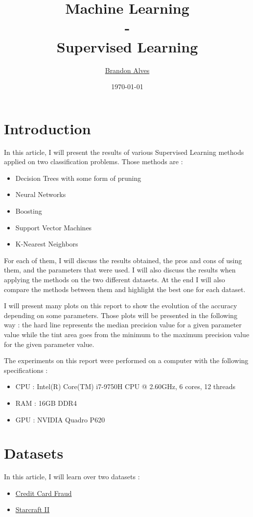 \documentclass[twocolumn, a4paper, 10pt]{article}
\title{
	Machine Learning
	\\-\\
	Supervised Learning
}
\author{
	\href{mailto:brandon.alves@gatech.edu}{Brandon Alves}
}
\date{\today}
\begin{document}
	\maketitle
	\tableofcontents
	\section{Introduction}
		In this article, I will present the results of various Supervised Learning methods applied on two classification problems. Those methods are :
		\begin{itemize}
			\item Decision Trees with some form of pruning
			\item Neural Networks
			\item Boosting
			\item Support Vector Machines
			\item K-Nearest Neighbors
		\end{itemize}
		For each of them, I will discuss the results obtained, the pros and cons of using them, and the parameters that were used. I will also discuss the results when applying the methods on the two different datasets. At the end I will also compare the methods between them and highlight the best one for each dataset.

		I will present many plots on this report to show the evolution of the accuracy depending on some parameters. Those plots will be presented in the following way : the hard line represents the median precision value for a given parameter value while the tint area goes from the minimum to the maximum precision value for the given parameter value.

		The experiments on this report were performed on a computer with the following specifications :
		\begin{itemize}
			\item CPU : Intel(R) Core(TM) i7-9750H CPU @ 2.60GHz, 6 cores, 12 threads
			\item RAM : 16GB DDR4
			\item GPU : NVIDIA Quadro P620
		\end{itemize}
	\section{Datasets}
		In this article, I will learn over two datasets :
		\begin{itemize}
			\item \href{https://www.kaggle.com/code/sngkadam/credit-card-fraud-detection/data}{Credit Card Fraud}
			\item \href{https://www.kaggle.com/c/the-insa-starcraft-2-player-prediction-challenge/data}{Starcraft II}
		\end{itemize}
\end{document}
